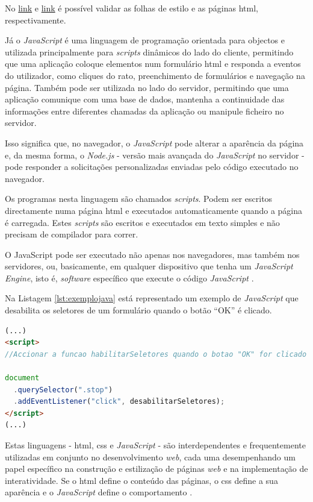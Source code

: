 No \href{https://jigsaw.w3.org/css-validator/}{link} e \href{https://validator.w3.org/}{link} é possível validar as folhas de estilo e as páginas \acrshort{html}, respectivamente.

Já o \textit{JavaScript} é uma linguagem de programação orientada para objectos e utilizada principalmente para \textit{scripts} dinâmicos do lado do cliente, permitindo que uma aplicação coloque elementos num formulário \acrshort{html} e responda a eventos do utilizador, como cliques do rato, preenchimento de formulários e navegação na página. Também pode ser utilizada no lado do servidor, permitindo que uma aplicação comunique com uma base de dados, mantenha a continuidade das informações entre diferentes chamadas da aplicação ou manipule ficheiro no servidor.

Isso significa que, no navegador, o \textit{JavaScript} pode alterar a aparência da página e, da mesma forma, o \textit{Node.js} - versão mais avançada do \textit{JavaScript} no servidor - pode responder a solicitações personalizadas enviadas pelo código executado no navegador.

Os programas nesta linguagem são chamados \textit{scripts}. Podem ser escritos directamente numa página \acrshort{html} e executados automaticamente quando a página é carregada. Estes \textit{scripts} são escritos e executados em texto simples e não precisam de compilador para correr.

O JavaScript pode ser executado não apenas nos navegadores, mas também nos servidores, ou, basicamente, em qualquer dispositivo que tenha um \textit{JavaScript Engine}, isto é, \textit{software} específico que execute o código \textit{JavaScript} \cite{JavaScriptRef}.

Na Listagem \ref{lst:exemplojava} está representado um exemplo de \textit{JavaScript} que desabilita os seletores de um formulário quando o botão ``OK'' é clicado.

\begin{minipage}{0.9\linewidth}
	\begin{lstlisting}[language=HTML, caption=Exemplo de \textit{JavaScript}, label=lst:exemplojava]
(...)
<script>
//Accionar a funcao habilitarSeletores quando o botao "OK" for clicado

document
  .querySelector(".stop")
  .addEventListener("click", desabilitarSeletores);
</script>
(...)
	\end{lstlisting}
\end{minipage}


Estas linguagens - \acrshort{html}, \acrshort{css} e \textit{JavaScript} - são interdependentes e frequentemente utilizadas em conjunto no desenvolvimento \textit{web}, cada uma desempenhando um papel específico na construção e estilização de páginas \textit{web} e na implementação de interatividade. Se o \acrshort{html} define o conteúdo das páginas, o \acrshort{css} define a sua aparência e o \textit{JavaScript} define o comportamento \cite{JavaScript}.


